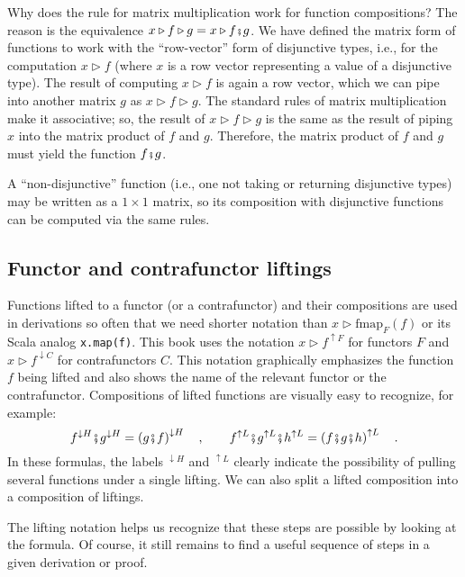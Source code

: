 Why does the rule for matrix multiplication work for function compositions?
The reason is the equivalence $x\triangleright f\triangleright g=x\triangleright f\bef g$.
We have defined the matrix form of functions to work with the \textsf{``}row-vector\textsf{''}
form of disjunctive types, i.e., for the computation $x\triangleright f$
(where $x$ is a row vector representing a value of a disjunctive
type). The result of computing $x\triangleright f$ is again a row
vector, which we can pipe into another matrix $g$ as $x\triangleright f\triangleright g$.
The standard rules of matrix multiplication make it associative; so,
the result of $x\triangleright f\triangleright g$ is the same as
the result of piping $x$ into the matrix product of $f$ and $g$.
Therefore, the matrix product of $f$ and $g$ must yield the function
$f\bef g$.

A \textsf{``}non-disjunctive\textsf{''} function (i.e., one not taking or returning
disjunctive types) may be written as a $1\times1$ matrix, so its
composition with disjunctive functions can be computed via the same
rules. 

\subsection{Functor and contrafunctor liftings}

Functions lifted to a functor (or a contrafunctor) and their compositions
are used in derivations so often that we need shorter notation than
$x\triangleright\text{fmap}_{F}(f)$ or its Scala analog \lstinline!x.map(f)!.
This book uses the notation $x\triangleright f^{\uparrow F}$ for
functors $F$ and $x\triangleright f^{\downarrow C}$ for contrafunctors
$C$. This notation graphically emphasizes the function $f$ being
lifted and also shows the name of the relevant functor or the contrafunctor.
Compositions of lifted functions are visually easy to recognize, for
example:
\[
f^{\downarrow H}\bef g^{\downarrow H}=\left(g\bef f\right)^{\downarrow H}\quad,\quad\quad f^{\uparrow L}\bef g^{\uparrow L}\bef h^{\uparrow L}=\left(f\bef g\bef h\right)^{\uparrow L}\quad.
\]
In these formulas, the labels $^{\downarrow H}$ and $^{\uparrow L}$
clearly indicate the possibility of pulling several functions under
a single lifting. We can also split a lifted composition into a composition
of liftings. 

The lifting notation helps us recognize that these steps are possible
by looking at the formula. Of course, it still remains to find a useful
sequence of steps in a given derivation or proof.

